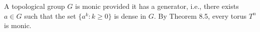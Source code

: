 A topological group $G$ is monic provided it has a generator, i.e., there exists $a \in G$ such that the set $\{a^k : k \geq 0\}$ is dense in $G$. By Theorem 8.5, every torus $T^n$ is monic.
